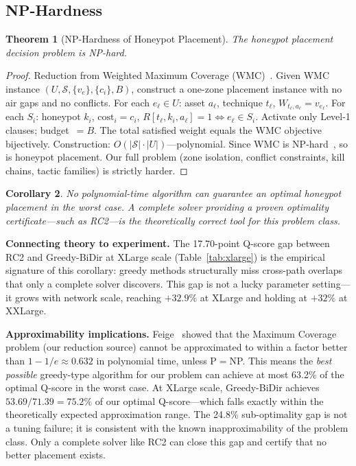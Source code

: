 \documentclass[journal]{IEEEtran}
\newtheorem{theorem}{Theorem}
\newtheorem{corollary}[theorem]{Corollary}
\begin{document}
\subsection{NP-Hardness}
\label{subsec:nphard}

\begin{theorem}[NP-Hardness of Honeypot Placement]
\label{thm:nphard}
The honeypot placement decision problem is NP-hard.
\end{theorem}

\begin{proofbox}
\begin{proof}
Reduction from Weighted Maximum Coverage
(WMC)~\cite{feige1998}.
Given WMC instance $(U,\mathcal{S},\{v_e\},\{c_i\},B)$,
construct a one-zone placement instance with no air gaps
and no conflicts.
For each $e_\ell\in U$: asset $a_\ell$, technique $t_\ell$,
$W_{t_\ell,a_\ell}=v_{e_\ell}$.
For each $S_i$: honeypot $k_i$, $\mathrm{cost}_i=c_i$,
$R[t_\ell,k_i,a_\ell]=1\iff e_\ell\in S_i$.
Activate only Level-1 clauses; budget~$=B$.
The total satisfied weight equals the WMC objective
bijectively.
Construction: $O(|\mathcal{S}|\cdot|U|)$---polynomial.
Since WMC is NP-hard~\cite{feige1998}, so is honeypot
placement.
Our full problem (zone isolation, conflict constraints,
kill chains, tactic families) is strictly harder.
\end{proof}
\end{proofbox}

\begin{corollary}
No polynomial-time algorithm can guarantee an optimal
honeypot placement in the worst case.
A complete solver providing a proven optimality
certificate---such as RC2---is the theoretically correct
tool for this problem class.
\end{corollary}

\begin{examplebox}
\textbf{Connecting theory to experiment.}
The 17.70-point Q-score gap between RC2 and Greedy-BiDir
at XLarge scale (Table~\ref{tab:xlarge}) is the empirical
signature of this corollary: greedy methods structurally
miss cross-path overlaps that only a complete solver
discovers.
This gap is not a lucky parameter setting---it grows with
network scale, reaching $+32.9\%$ at XLarge and holding
at $+32\%$ at XXLarge.

\textbf{Approximability implications.}
Feige~\cite{feige1998} showed that the Maximum Coverage
problem (our reduction source) cannot be approximated to
within a factor better than $1-1/e \approx 0.632$ in
polynomial time, unless P$=$NP.
This means the \emph{best possible} greedy-type algorithm
for our problem can achieve at most 63.2\% of the optimal
Q-score in the worst case.
At XLarge scale, Greedy-BiDir achieves
$53.69/71.39 = 75.2\%$ of our optimal Q-score---which
falls exactly within the theoretically expected
approximation range.
The 24.8\% sub-optimality gap is not a tuning
failure; it is consistent with the known inapproximability
of the problem class.
Only a complete solver like RC2 can close this gap and
certify that no better placement exists.
\end{examplebox}
\end{document}
